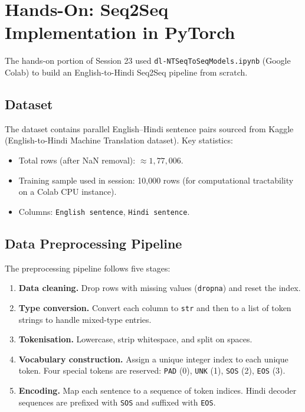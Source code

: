 \documentclass[12pt,a4paper]{article}
\begin{document}
\section{Hands-On: Seq2Seq Implementation in PyTorch}
\label{sec:handson}

The hands-on portion of Session 23 used
\texttt{dl-NTSeqToSeqModels.ipynb} (Google Colab) to build an
English-to-Hindi Seq2Seq pipeline from scratch.

\subsection{Dataset}
\label{subsec:dataset}

The dataset contains parallel English--Hindi sentence pairs sourced from
Kaggle (English-to-Hindi Machine Translation dataset).  Key statistics:

\begin{itemize}
  \item Total rows (after NaN removal): $\approx 1{,}77{,}006$.
  \item Training sample used in session: 10{,}000 rows (for computational
        tractability on a Colab CPU instance).
  \item Columns: \texttt{English sentence}, \texttt{Hindi sentence}.
\end{itemize}

\subsection{Data Preprocessing Pipeline}
\label{subsec:preprocessing}

The preprocessing pipeline follows five stages:

\begin{enumerate}
  \item \textbf{Data cleaning.}  Drop rows with missing values
        (\texttt{dropna}) and reset the index.
  \item \textbf{Type conversion.}  Convert each column to \texttt{str} and
        then to a list of token strings to handle mixed-type entries.
  \item \textbf{Tokenisation.}  Lowercase, strip whitespace, and split on
        spaces.
  \item \textbf{Vocabulary construction.}  Assign a unique integer index to
        each unique token.  Four special tokens are reserved:
        \texttt{PAD} (0), \texttt{UNK} (1), \texttt{SOS} (2), \texttt{EOS} (3).
  \item \textbf{Encoding.}  Map each sentence to a sequence of token indices.
        Hindi decoder sequences are prefixed with \texttt{SOS} and suffixed
        with \texttt{EOS}.
\end{enumerate}
\end{document}
